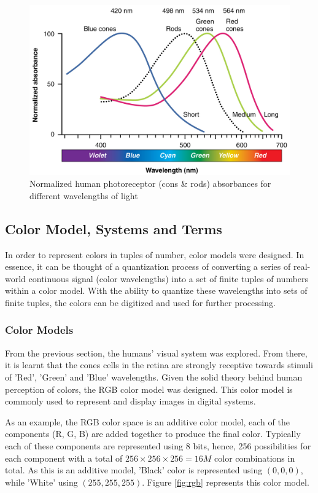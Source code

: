 \begin{figure}[hbt!]\centering
\includegraphics[width=.7\textwidth]{image/lit/ColorSensitivity.jpg}
\caption{Normalized human photoreceptor (cons \& rods) absorbances for different wavelengths of light}
\label{fig:visibleSpectrum}
\end{figure}




\subsection{Color Model, Systems and Terms}
\label{section:colorterm}

In order to represent colors in tuples of number, color models were designed. In essence, it can be thought of a quantization process of converting a series of real-world continuous signal (color wavelengths) into a set of finite tuples of numbers within a color model. 
With the ability to quantize these wavelengths into sets of finite tuples, the colors can be digitized and used for further processing.


\subsubsection{Color Models}
From the previous section, the humans' visual system was explored. From there, it is learnt that the cones cells in the retina are strongly receptive towards stimuli of 'Red', 'Green' and 'Blue' wavelengths. Given the solid theory behind human perception of colors, the RGB color model was designed. This color model is commonly used to represent and display images in digital systems. 

As an example, the RGB color space is an additive color model, each of the components (R, G, B) are added together to produce the final color. Typically each of these components are represented using 8 bits, hence, 256 possibilities for each component with a total of $256 \times 256 \times 256 = 16M$ color combinations in total. As this is an additive model, 'Black' color is  represented using $(0, 0, 0)$, while 'White' using $(255, 255, 255)$. Figure \ref{fig:rgb} represents this color model.

